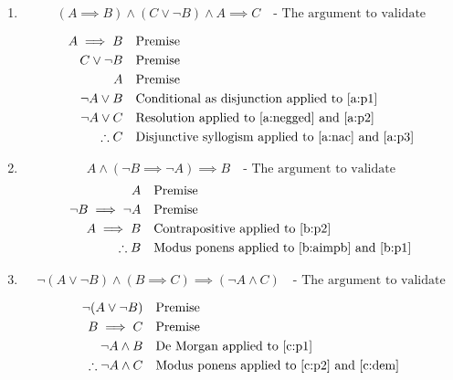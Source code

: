 \documentclass{article}
\begin{document}
\begin{enumerate}[label=\alph*)]
\item
\[
(A \implies B) \land (C \lor \neg B) \land A \implies C \quad \text{- The argument to validate}
\]

\begin{align}
\label{a:p1}         A \implies B     & \quad \text{Premise}\\
\label{a:p2}         C \lor \neg B    & \quad \text{Premise}\\
\label{a:p3}         A                & \quad \text{Premise}\\
\label{a:negged}     \neg A \lor B    & \quad \text{Conditional as disjunction applied to \ref{a:p1}}\\
\label{a:nac}        \neg A \lor C    & \quad \text{Resolution applied to \ref{a:negged} and \ref{a:p2}}\\
                     \therefore C     & \quad \text{Disjunctive syllogism applied to \ref{a:nac} and \ref{a:p3}}
\end{align}

\item
\setcounter{equation}{0}
\[
A \land (\neg B \implies \neg A) \implies B \quad \text{- The argument to validate}
\]
\begin{align}
\label{b:p1}         A                       & \quad \text{Premise} \\
\label{b:p2}         \neg B \implies \neg A  & \quad \text{Premise} \\
\label{b:aimpb}      A \implies B            & \quad \text{Contrapositive applied to \ref{b:p2}}\\
                     \therefore B            & \quad \text{Modus ponens applied to \ref{b:aimpb} and \ref{b:p1}}
\end{align}

\item
\setcounter{equation}{0}
\[
\neg (A \lor \neg B) \land (B \implies C) \implies (\neg A \land C) \quad \text{- The argument to validate}
\]

\begin{align}
\label{c:p1}    \neg (A \lor \neg B)      & \quad \text{Premise} \\
\label{c:p2}    B \implies C              & \quad \text{Premise} \\
\label{c:dem}   \neg A \land B            & \quad \text{De Morgan applied to \ref{c:p1}} \\
\label{c:mp}    \therefore \neg A \land C & \quad \text{Modus ponens applied to \ref{c:p2} and \ref{c:dem}}
\end{align}


\end{enumerate}
\end{document}
